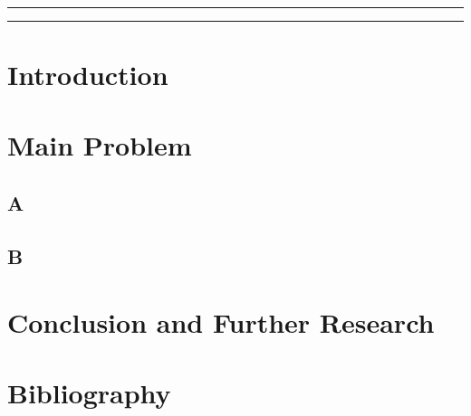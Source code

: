\documentclass[12pt,a4paper]{article}
\newcommand{\GRule}{\rule{\linewidth}{0.01cm}}
\begin{document}
\begin{titlepage}
\begin{minipage}{0.59\textwidth}
    \vspace{1.25cm}
  \end{minipage}\\
  \begin{minipage}{0.3\textwidth}
    \GRule
  \end{minipage}\hspace{1.2cm}
  \begin{minipage}{0.59\textwidth}
    \GRule
  \end{minipage}
\end{titlepage}
\tableofcontents
\section{Introduction}
\section{Main Problem}
\subsection{A}
\subsection{B}

\section{Conclusion and Further Research}
\section{Bibliography}
\end{document}
